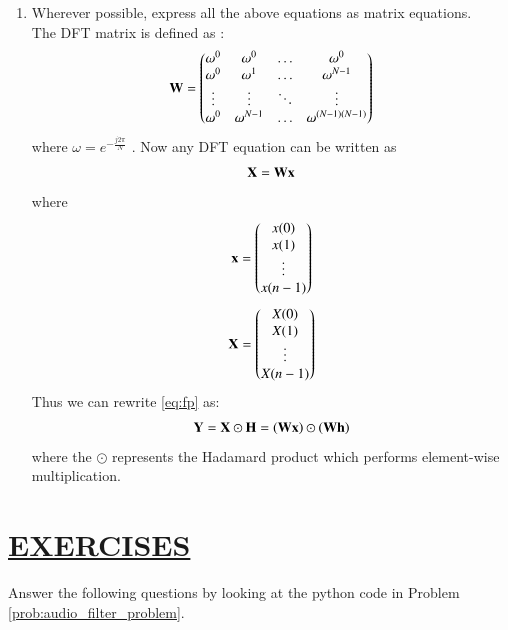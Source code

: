 \documentclass[journal,12pt,twocolumn]{IEEEtran}
\theoremstyle{remark}
\begin{document}
\begin{enumerate}[label=\thesection.\arabic*]
\item Wherever possible, express all the above equations as matrix equations.\\
\solution The DFT matrix is defined as : 
\begin{align}
	\mathbf{W} = 
	\begin{pmatrix}
		\omega^0 & \omega^0 & \ldots & \omega^0 \\
		\omega^0 & \omega^1 & \ldots & \omega^{N - 1} \\
		\vdots & \vdots & \ddots & \vdots \\
		\omega^0 & \omega^{N - 1} & \ldots & \omega^{(N -1)(N - 1)}
	\end{pmatrix}
\end{align}
where $\omega=e^{-\frac{j2\pi}{N}}$ . Now any DFT equation can be written as
\begin{align}
    \mathbf{X} = \mathbf{W}\mathbf{x}
\end{align}
\noindent where
\begin{align}
	\mathbf{x} = 
	\begin{pmatrix}
		x(0) \\ x(1) \\ \vdots \\ x(n - 1)
	\end{pmatrix}
\end{align}
\begin{align}
	\mathbf{X} = 
	\begin{pmatrix}
		X(0) \\ X(1) \\ \vdots \\ X(n - 1)
	\end{pmatrix}
\end{align}
Thus we can rewrite  \eqref{eq:fp} as:
\begin{align}
	\mathbf{Y} = \mathbf{X}\odot\mathbf{H} = \left(\mathbf{W}\mathbf{x}\right)\odot\left(\mathbf{W}\mathbf{h}\right)
\end{align}
where the $\odot$ represents the Hadamard product which performs element-wise multiplication.

\end{enumerate}

\section{\underline{EXERCISES}}
\noindent Answer the following questions by looking at the python code in Problem \ref{prob:audio_filter_problem}.
\end{document}

